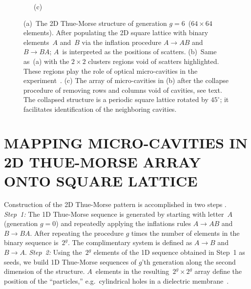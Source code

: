 \begin{figure}
\begin{flushleft} 
\ \ \ (c)
\end{flushleft}
\vskip -0.2in
\caption[(a)~The 2D Thue-Morse structure of generation $g=6$~($64\times64$ elements).]{\label{fig:mapping_procedure} (a)~The 2D Thue-Morse structure of generation $g=6$~($64\times64$ elements). After populating the 2D square lattice with binary elements~$A$ and~$B$ via the inflation procedure $A\rightarrow AB$ and $B\rightarrow BA$; $A$~is interpreted as the positions of scatters. (b)~Same as~(a) with the $2\times2$ clusters regions void of scatters highlighted. These regions play the role of optical micro-cavities in the experiment~\cite{2011_Cao_DAS}. (c) The array of micro-cavities in (b) after the collapse procedure of removing rows and columns void of cavities, see text. The collapsed structure is a periodic square lattice rotated by $45^\circ$; it facilitates identification of the neighboring cavities.}
\end{figure}

\section{MAPPING MICRO-CAVITIES IN 2D THUE-MORSE ARRAY \\ONTO SQUARE LATTICE}

Construction of the 2D Thue-Morse pattern is accomplished in two steps \cite{2008_Negro}. {\it Step~1:} The 1D Thue-Morse sequence is generated by starting with letter~$A$ (generation $g=0$) and repeatedly applying the inflations rules $A\rightarrow AB$ and $B\rightarrow BA$. After repeating the procedure $g$ times the number of elements in the binary sequence is~$2^g$. The complimentary system is defined as $A\rightarrow B$ and $B\rightarrow A$. {\it Step~2:} Using the~$2^g$ elements of the 1D sequence obtained in Step~1 as seeds, we build 1D Thue-Morse sequences of $g$'th generation along the second dimension of the structure. $A$~elements in the resulting~$2^g\times2^g$ array define the position of the ``particles,'' e.g.~cylindrical holes in a dielectric membrane~\cite{2011_Cao_DAS}.  

